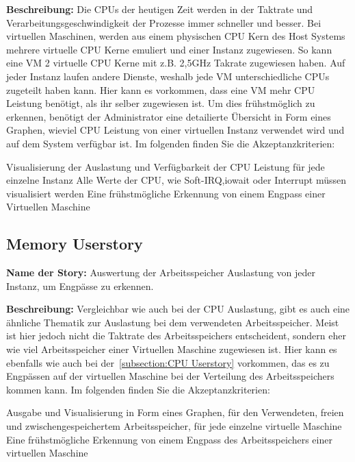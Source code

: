 \textbf{Beschreibung:} Die CPUs der heutigen Zeit werden in der Taktrate und
Verarbeitungsgeschwindigkeit der Prozesse immer schneller und besser. Bei
virtuellen Maschinen, werden aus einem physischen CPU Kern des Host Systems
mehrere virtuelle CPU Kerne emuliert und einer Instanz zugewiesen. So kann eine
VM 2 virtuelle CPU Kerne mit z.B. 2,5GHz Takrate zugewiesen haben. Auf jeder
Instanz laufen andere Dienste, weshalb jede VM unterschiedliche CPUs zugeteilt
haben kann. Hier kann es vorkommen, dass eine VM mehr CPU Leistung benötigt,
als ihr selber zugewiesen ist. Um dies frühstmöglich zu erkennen, benötigt der
Administrator eine detailierte Übersicht in Form eines Graphen, wieviel CPU
Leistung von einer virtuellen Instanz verwendet wird und auf dem System
verfügbar ist. Im folgenden finden Sie die Akzeptanzkriterien:

\begin{outline}
  \1 Visualisierung der Auslastung und Verfügbarkeit der CPU Leistung für jede
  einzelne Instanz
  \1 Alle Werte der CPU, wie \gls{Soft-IRQ},\gls{iowait} oder \gls{Interrupt}
  müssen visualisiert werden
  \1 Eine frühstmögliche Erkennung von einem Engpass einer Virtuellen Maschine
\end{outline}
\mr%

\subsection{Memory Userstory}
\textbf{Name der Story:} Auswertung der Arbeitsspeicher Auslastung von jeder
Instanz, um Engpässe zu erkennen.

\textbf{Beschreibung:} Vergleichbar wie auch bei der CPU Auslastung, gibt es
auch eine ähnliche Thematik zur Auslastung bei dem verwendeten Arbeitsspeicher.
Meist ist hier jedoch nicht die Taktrate des Arbeitsspeichers entscheident,
sondern eher wie viel Arbeitsspeicher einer Virtuellen Maschine zugewiesen ist.
Hier kann es ebenfalls wie auch bei der~\ref{subsection:CPU Userstory}
vorkommen, das es zu Engpässen auf der virtuellen Maschine bei der Verteilung
des Arbeitsspeichers kommen kann. Im folgenden finden Sie die
Akzeptanzkriterien:

\begin{outline}
  \1 Ausgabe und Visualisierung in Form eines Graphen, für den Verwendeten,
  freien und zwischengespeichertem Arbeitsspeicher, für jede einzelne virtuelle
  Maschine
  \1 Eine frühstmögliche Erkennung von einem Engpass des Arbeitsspeichers einer
  virtuellen Maschine
\end{outline}
\mr%

